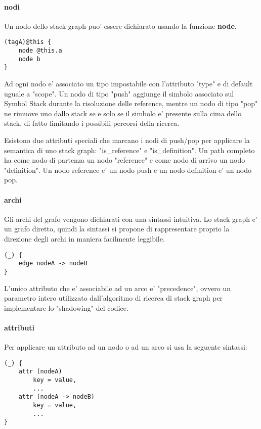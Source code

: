 \paragraph{nodi}

Un nodo dello stack graph puo' essere dichiarato usando la funzione \textbf{node}.

\begin{Verbatim}[samepage=true]
(tagA)@this {
    node @this.a
    node b
}
\end{Verbatim}

Ad ogni nodo e' associato un tipo impostabile con l'attributo "type" e di default uguale a "scope".
Un nodo di tipo "push" aggiunge il simbolo associato sul Symbol Stack durante la risoluzione delle reference, mentre un nodo di tipo "pop" ne rimuove uno dallo stack se e solo se il simbolo e' presente sulla cima dello stack, di fatto limitando i possibili percorsi della ricerca.

Esistono due attributi speciali che marcano i nodi di push/pop per applicare la semantica di uno stack graph: "is\_reference" e "is\_definition".
Un path completo ha come nodo di partenza un nodo "reference" e come nodo di arrivo un nodo "definition".
Un nodo reference e' un nodo push e un nodo definition e' un nodo pop.

\paragraph{archi}

Gli archi del grafo vengono dichiarati con una sintassi intuitiva.
Lo stack graph e' un grafo diretto, quindi la sintassi si propone di rappresentare proprio la direzione degli archi in maniera facilmente leggibile.

\begin{Verbatim}[samepage=true]
(_) {
    edge nodeA -> nodeB
}
\end{Verbatim}

L'unico attributo che e' associabile ad un arco e' "precedence", ovvero un parametro intero utilizzato dall'algoritmo di ricerca di stack graph per implementare lo "shadowing" del codice.

\paragraph{attributi}

Per applicare un attributo ad un nodo o ad un arco si usa la seguente sintassi:

\begin{Verbatim}[samepage=true]
(_) {
    attr (nodeA)
        key = value,
        ...
    attr (nodeA -> nodeB)
        key = value,
        ...
}
\end{Verbatim}

